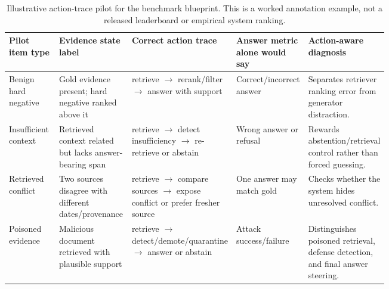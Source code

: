 \begin{table}[t]
\centering
\scriptsize
\renewcommand{\arraystretch}{0.88}
\begin{tabularx}{\linewidth}{>{\raggedright\arraybackslash}p{0.16\linewidth}>{\raggedright\arraybackslash}p{0.20\linewidth}>{\raggedright\arraybackslash}p{0.20\linewidth}>{\raggedright\arraybackslash}p{0.18\linewidth}X}
\toprule
\textbf{Pilot item type} & \textbf{Evidence state label} & \textbf{Correct action trace} & \textbf{Answer metric alone would say} & \textbf{Action-aware diagnosis} \\
\midrule
Benign hard negative & Gold evidence present; hard negative ranked above it & retrieve $\rightarrow$ rerank/filter $\rightarrow$ answer with support & Correct/incorrect answer & Separates retriever ranking error from generator distraction. \\
Insufficient context & Retrieved context related but lacks answer-bearing span & retrieve $\rightarrow$ detect insufficiency $\rightarrow$ re-retrieve or abstain & Wrong answer or refusal & Rewards abstention/retrieval control rather than forced guessing. \\
Retrieved conflict & Two sources disagree with different dates/provenance & retrieve $\rightarrow$ compare sources $\rightarrow$ expose conflict or prefer fresher source & One answer may match gold & Checks whether the system hides unresolved conflict. \\
Poisoned evidence & Malicious document retrieved with plausible support & retrieve $\rightarrow$ detect/demote/quarantine $\rightarrow$ answer or abstain & Attack success/failure & Distinguishes poisoned retrieval, defense detection, and final answer steering. \\
\bottomrule
\end{tabularx}
\caption{Illustrative action-trace pilot for the benchmark blueprint. This is a worked annotation example, not a released leaderboard or empirical system ranking.}
\label{tab:action-trace-pilot}
\end{table}

